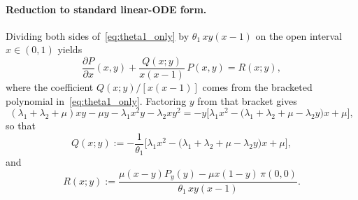 \paragraph{Reduction to standard linear-ODE form.}
Dividing both sides of~\eqref{eq:theta1_only} by $\theta_1\, xy(x-1)$ on the open interval $x \in (0,1)$ yields
\begin{equation}
    \frac{\partial P}{\partial x}(x,y) + \frac{Q(x;y)}{x(x-1)}\, P(x,y) = R(x;y),
    \label{eq:linear_ode_x}
\end{equation}
where the coefficient $Q(x;y)/[x(x-1)]$ comes from the bracketed polynomial in~\eqref{eq:theta1_only}. Factoring $y$ from that bracket gives
\begin{equation}
    (\lambda_1+\lambda_2+\mu)xy - \mu y - \lambda_1 x^2 y - \lambda_2 x y^2
    = -y\Big[\lambda_1 x^2 - \big(\lambda_1 + \lambda_2 + \mu - \lambda_2 y\big)x + \mu\Big],
\end{equation}
so that
\begin{equation}
    Q(x;y) := -\frac{1}{\theta_1}\Big[\lambda_1 x^2 - \big(\lambda_1 + \lambda_2 + \mu - \lambda_2 y\big)x + \mu\Big],
    \label{eq:Q_def}
\end{equation}
and
\begin{equation}
    R(x;y) := \frac{\mu(x-y) P_y(y) - \mu x(1-y)\, \pi(0,0)}{\theta_1\, xy(x-1)}.
    \label{eq:R_def}
\end{equation}

